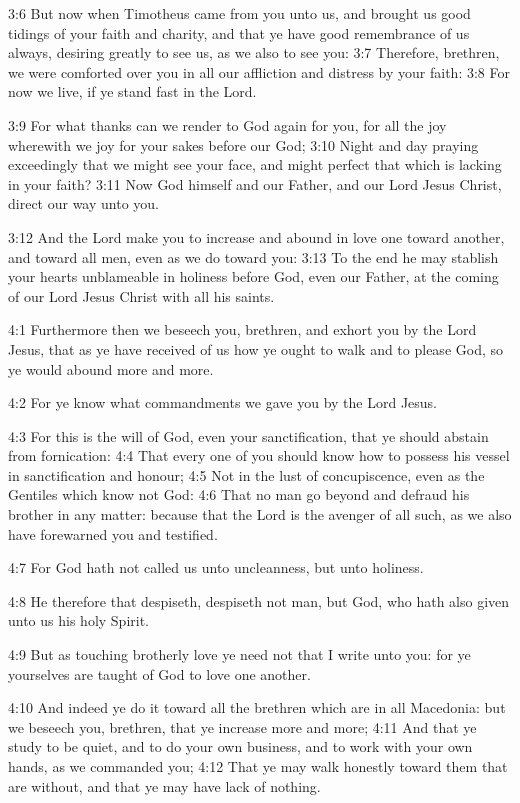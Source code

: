 3:6 But now when Timotheus came from you unto us, and brought us good tidings of your faith and charity, and that ye have good remembrance of us always, desiring greatly to see us, as we also to see you: 3:7 Therefore, brethren, we were comforted over you in all our affliction and distress by your faith: 3:8 For now we live, if ye stand fast in the Lord.

3:9 For what thanks can we render to God again for you, for all the joy wherewith we joy for your sakes before our God; 3:10 Night and day praying exceedingly that we might see your face, and might perfect that which is lacking in your faith?  3:11 Now God himself and our Father, and our Lord Jesus Christ, direct our way unto you.

3:12 And the Lord make you to increase and abound in love one toward another, and toward all men, even as we do toward you: 3:13 To the end he may stablish your hearts unblameable in holiness before God, even our Father, at the coming of our Lord Jesus Christ with all his saints.

4:1 Furthermore then we beseech you, brethren, and exhort you by the Lord Jesus, that as ye have received of us how ye ought to walk and to please God, so ye would abound more and more.

4:2 For ye know what commandments we gave you by the Lord Jesus.

4:3 For this is the will of God, even your sanctification, that ye should abstain from fornication: 4:4 That every one of you should know how to possess his vessel in sanctification and honour; 4:5 Not in the lust of concupiscence, even as the Gentiles which know not God: 4:6 That no man go beyond and defraud his brother in any matter: because that the Lord is the avenger of all such, as we also have forewarned you and testified.

4:7 For God hath not called us unto uncleanness, but unto holiness.

4:8 He therefore that despiseth, despiseth not man, but God, who hath also given unto us his holy Spirit.

4:9 But as touching brotherly love ye need not that I write unto you: for ye yourselves are taught of God to love one another.

4:10 And indeed ye do it toward all the brethren which are in all Macedonia: but we beseech you, brethren, that ye increase more and more; 4:11 And that ye study to be quiet, and to do your own business, and to work with your own hands, as we commanded you; 4:12 That ye may walk honestly toward them that are without, and that ye may have lack of nothing.

